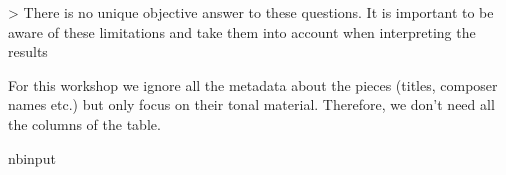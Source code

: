 \documentclass[letterpaper,10pt,english]{sphinxmanual}
\begin{document}
\sphinxAtStartPar
\textendash{}\textgreater{} There is no unique objective answer to these questions. It is important to be aware of these limitations and take them into account when interpreting the results

\sphinxAtStartPar
For this workshop we ignore all the metadata about the pieces (titles, composer names etc.) but only focus on their tonal material. Therefore, we don’t need all the columns of the table.

\begin{sphinxuseclass}{nbinput}
{
\begin{sphinxVerbatim}[commandchars=\\\{\}]
\llap{\color{nbsphinxin}[9]:\,\hspace{\fboxrule}\hspace{\fboxsep}}  \PYG{p}{[} \PYG{p}{]} 
\end{sphinxVerbatim}
}

\end{sphinxuseclass}
\end{document}
